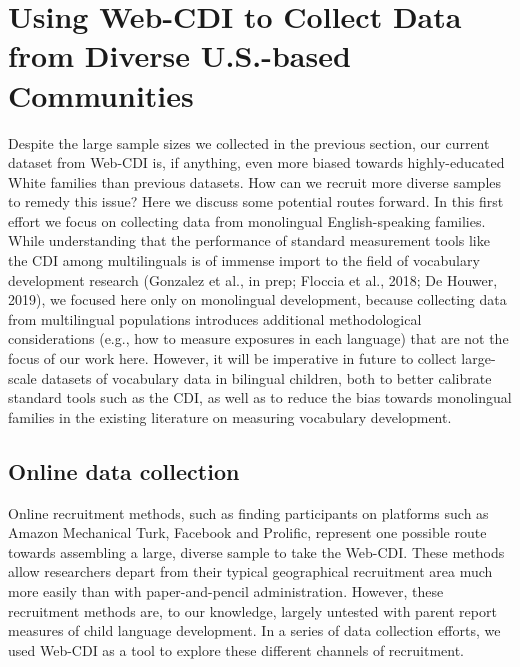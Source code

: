 \documentclass[
  english,
  ,man,floatsintext]{apa6}
\begin{document}
\hypertarget{using-web-cdi-to-collect-data-from-diverse-u.s.-based-communities}{%
\section{Using Web-CDI to Collect Data from Diverse U.S.-based Communities}\label{using-web-cdi-to-collect-data-from-diverse-u.s.-based-communities}}

Despite the large sample sizes we collected in the previous section, our current dataset from Web-CDI is, if anything, even more biased towards highly-educated White families than previous datasets. How can we recruit more diverse samples to remedy this issue? Here we discuss some potential routes forward. In this first effort we focus on collecting data from monolingual English-speaking families. While understanding that the performance of standard measurement tools like the CDI among multilinguals is of immense import to the field of vocabulary development research (Gonzalez et al., in prep; Floccia et al., 2018; De Houwer, 2019), we focused here only on monolingual development, because collecting data from multilingual populations introduces additional methodological considerations (e.g., how to measure exposures in each language) that are not the focus of our work here. However, it will be imperative in future to collect large-scale datasets of vocabulary data in bilingual children, both to better calibrate standard tools such as the CDI, as well as to reduce the bias towards monolingual families in the existing literature on measuring vocabulary development.

\hypertarget{online-data-collection}{%
\subsection{Online data collection}\label{online-data-collection}}

Online recruitment methods, such as finding participants on platforms such as Amazon Mechanical Turk, Facebook and Prolific, represent one possible route towards assembling a large, diverse sample to take the Web-CDI. These methods allow researchers depart from their typical geographical recruitment area much more easily than with paper-and-pencil administration. However, these recruitment methods are, to our knowledge, largely untested with parent report measures of child language development. In a series of data collection efforts, we used Web-CDI as a tool to explore these different channels of recruitment.
\end{document}
